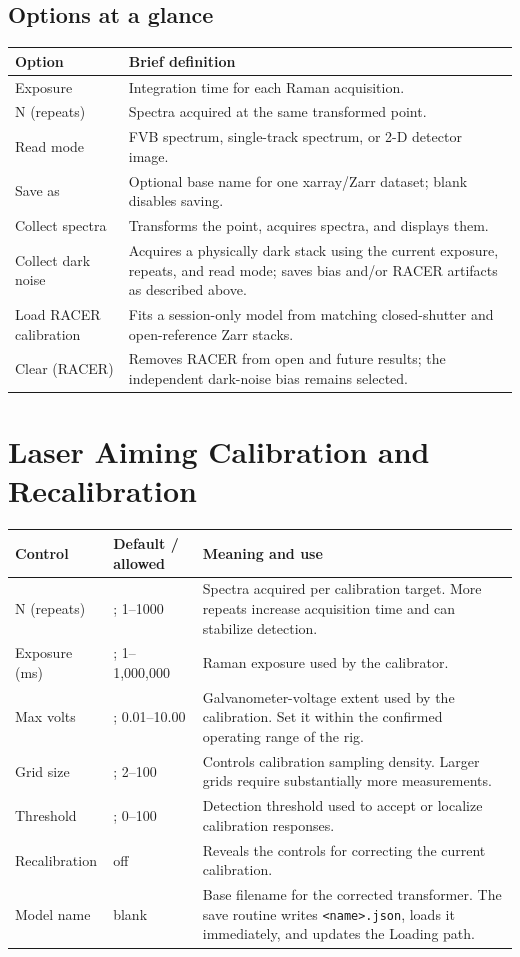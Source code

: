 \documentclass[11pt,oneside]{report}
\makeatletter
\newcommand{\code}[1]{\texttt{#1}}
\newcommand{\fieldtable}{\begin{longtable}{@{}>{\raggedright\arraybackslash}p{0.25\textwidth}>{\raggedright\arraybackslash}p{0.18\textwidth}>{\raggedright\arraybackslash}p{0.50\textwidth}@{}}\toprule\textbf{Control} & \textbf{Default / allowed} & \textbf{Meaning and use}\\\midrule\endhead}
\newcommand{\finishfieldtable}{\bottomrule\end{longtable}}
\makeatother
\begin{document}
\section*{Options at a glance}
\begin{longtable}{@{}p{}p{}@{}}
\toprule\textbf{Option} & \textbf{Brief definition}\\\midrule
Exposure & Integration time for each Raman acquisition.\\
N (repeats) & Spectra acquired at the same transformed point.\\
Read mode & FVB spectrum, single-track spectrum, or 2-D detector image.\\
Save as & Optional base name for one xarray/Zarr dataset; blank disables saving.\\
Collect spectra & Transforms the point, acquires spectra, and displays them.\\
Collect dark noise & Acquires a physically dark stack using the current exposure,
repeats, and read mode; saves bias and/or RACER artifacts as described above.\\
Load RACER calibration & Fits a session-only model from matching closed-shutter and
open-reference Zarr stacks.\\
Clear (RACER) & Removes RACER from open and future results; the independent
dark-noise bias remains selected.\\
\bottomrule\end{longtable}

\chapter{Laser Aiming Calibration and Recalibration}

\fieldtable
N (repeats) & 20; 1--1000 & Spectra acquired per calibration target. More repeats
increase acquisition time and can stabilize detection.\\
Exposure (ms) & 1000; 1--1,000,000 & Raman exposure used by the calibrator.\\
Max volts & 1.80; 0.01--10.00 & Galvanometer-voltage extent used by the
calibration. Set it within the confirmed operating range of the rig.\\
Grid size & 10; 2--100 & Controls calibration
sampling density. Larger grids require substantially more measurements.\\
Threshold & 1.00; 0--100 & Detection threshold used to accept or localize
calibration responses.\\
Recalibration & off & Reveals the controls for correcting the current calibration.\\
Model name & blank & Base filename for the corrected transformer. The save routine
writes \code{<name>.json}, loads it immediately, and updates the Loading path.\\
\finishfieldtable
\end{document}
